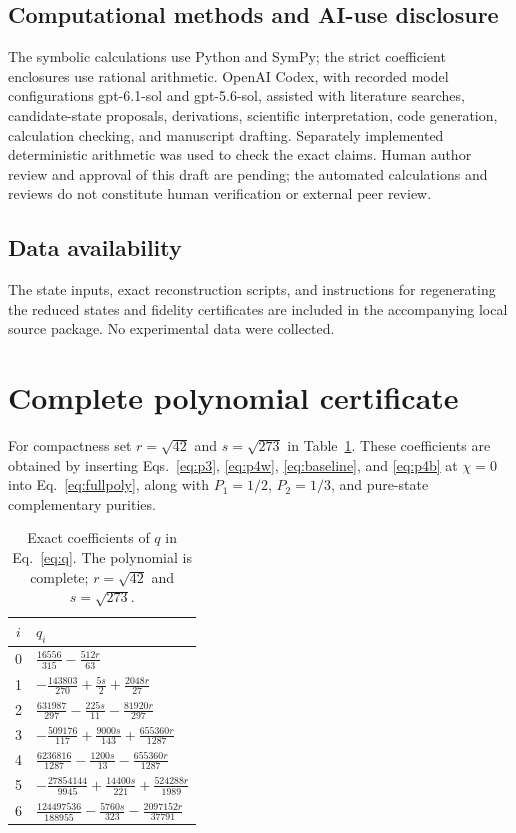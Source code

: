 \documentclass[aps,pra,reprint,onecolumn,notitlepage,longbibliography]{revtex4-2}
\begin{document}
\subsection*{Computational methods and AI-use disclosure}
The symbolic calculations use Python and SymPy; the strict coefficient enclosures use rational arithmetic. OpenAI Codex, with recorded model configurations gpt-6.1-sol and gpt-5.6-sol, assisted with literature searches, candidate-state proposals, derivations, scientific interpretation, code generation, calculation checking, and manuscript drafting. Separately implemented deterministic arithmetic was used to check the exact claims. Human author review and approval of this draft are pending; the automated calculations and reviews do not constitute human verification or external peer review.

\subsection*{Data availability}
The state inputs, exact reconstruction scripts, and instructions for regenerating the reduced states and fidelity certificates are included in the accompanying local source package. No experimental data were collected.

\appendix
\section{Complete polynomial certificate}
\label{app:certificate}
For compactness set $r=\sqrt{42}$ and $s=\sqrt{273}$ in Table~\ref{tab:q}. These coefficients are obtained by inserting Eqs.~\eqref{eq:p3}, \eqref{eq:p4w}, \eqref{eq:baseline}, and \eqref{eq:p4b} at $\chi=0$ into Eq.~\eqref{eq:fullpoly}, along with $P_1=1/2$, $P_2=1/3$, and pure-state complementary purities.
\begin{table}[h]
\caption{Exact coefficients of $q$ in Eq.~\eqref{eq:q}. The polynomial is complete; $r=\sqrt{42}$ and $s=\sqrt{273}$.}
\label{tab:q}
\renewcommand{\arraystretch}{1.45}
\begin{tabular}{cl}
\toprule
$i$ & $q_i$\\
\midrule
0 & $\displaystyle \frac{16556}{315}-\frac{512r}{63}$\\[5pt]
1 & $\displaystyle -\frac{143803}{270}+\frac{5s}{2}+\frac{2048r}{27}$\\[5pt]
2 & $\displaystyle \frac{631987}{297}-\frac{225s}{11}-\frac{81920r}{297}$\\[5pt]
3 & $\displaystyle -\frac{509176}{117}+\frac{9000s}{143}+\frac{655360r}{1287}$\\[5pt]
4 & $\displaystyle \frac{6236816}{1287}-\frac{1200s}{13}-\frac{655360r}{1287}$\\[5pt]
5 & $\displaystyle -\frac{27854144}{9945}+\frac{14400s}{221}+\frac{524288r}{1989}$\\[5pt]
6 & $\displaystyle \frac{124497536}{188955}-\frac{5760s}{323}-\frac{2097152r}{37791}$\\[3pt]
\bottomrule
\end{tabular}
\end{table}
\end{document}
